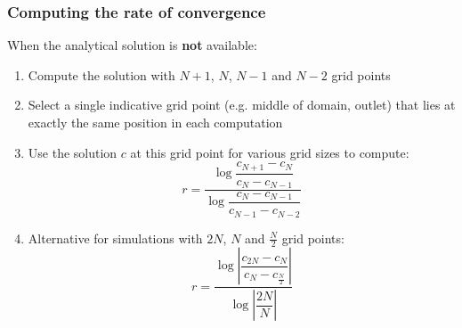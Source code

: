 \documentclass[11pt,table,final,fleqn,xcolor={usenames,dvipsnames,table}]{beamer}
\begin{document}
\begin{frame}[fragile]
  \frametitle{Computing the rate of convergence}
  \footnotesize\selectfont
  When the analytical solution is \textbf{not} available:
  \begin{enumerate}
  \footnotesize\selectfont
    \item Compute the solution with $N+1$, $N$, $N-1$ and $N-2$ grid points
    \item Select a single indicative grid point (e.g. middle of domain, outlet) that lies at exactly the same position in each computation
    \item Use the solution $c$ at this grid point for various grid sizes to compute:
    \[\displaystyle
      r = \dfrac{\log \dfrac{c_{N+1}  - c_N}{c_N - c_{N-1}}} {\log \dfrac{c_N - c_{N-1}}{c_{N-1} - c_{N-2}}}
    \]
    \item Alternative for simulations with $2N$, $N$ and $\frac{N}{2}$ grid points:
    \[\displaystyle
     r = \dfrac { \log \left|\dfrac{c_{2N}  - c_N}{c_N - c_{\frac{N}{2}} }\right|} {\log \left|\dfrac{2N}{N}\right|}
  \]
   \end{enumerate}
\end{frame}

\end{document}
